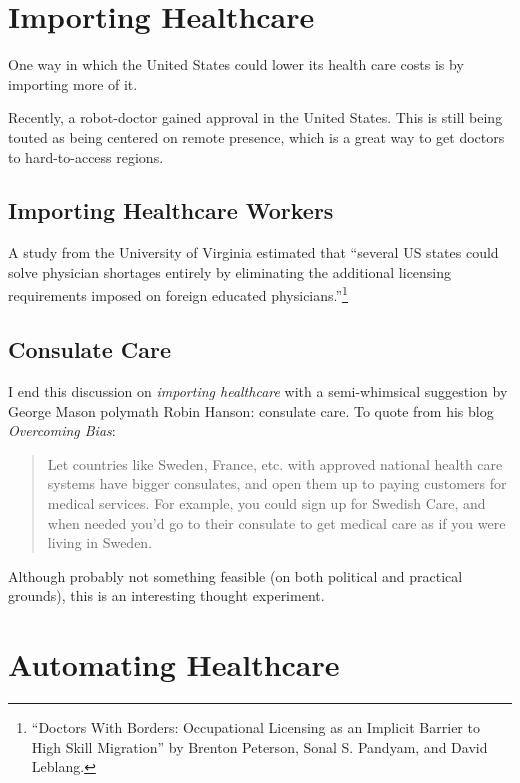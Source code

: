 \section{Importing Healthcare}

One way in which the United States could lower its health care costs is by
importing more of it.

Recently, a robot-doctor gained approval in the United States. This is still
being touted as being centered on remote presence, which is a great way to get
doctors to hard-to-access regions.


\subsection{Importing Healthcare Workers}

A study from the University of Virginia estimated that ``several US states
could solve physician shortages entirely by eliminating the additional
licensing requirements imposed on foreign educated
physicians.''\footnote{``Doctors With Borders: Occupational Licensing as an
Implicit Barrier to High Skill Migration'' by Brenton Peterson, Sonal S.
Pandyam, and David Leblang.}

\subsection{Consulate Care}

I end this discussion on \emph{importing healthcare} with a semi-whimsical
suggestion by George Mason polymath Robin Hanson: consulate care. To quote from
his blog \emph{Overcoming Bias}:

\begin{quote}
Let countries like Sweden, France, etc. with approved national health care
systems have bigger consulates, and open them up to paying customers for
medical services. For example, you could sign up for Swedish Care, and when
needed you’d go to their consulate to get medical care as if you were living in
Sweden.
\end{quote}

Although probably not something feasible (on both political and practical
grounds), this is an interesting thought experiment.

\section{Automating Healthcare}

